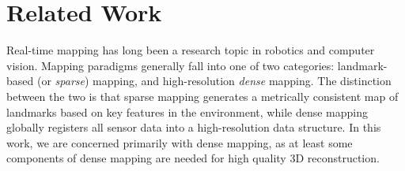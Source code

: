 \documentclass[10pt,twocolumn,letterpaper]{article}
\begin{document}
\section{Related Work}
Real-time mapping  has long been a research topic in robotics and computer
vision. Mapping paradigms generally fall into one of two categories:
landmark-based (or \emph{sparse}) mapping, and high-resolution \emph{dense}
mapping. The distinction between the two is that sparse mapping generates a
metrically consistent map of landmarks based on key features in the
environment, while dense mapping globally registers all sensor data into a
high-resolution data structure. In this work, we are concerned primarily with
dense mapping, as at least some components of dense mapping are needed for high
quality 3D reconstruction.
\end{document}
